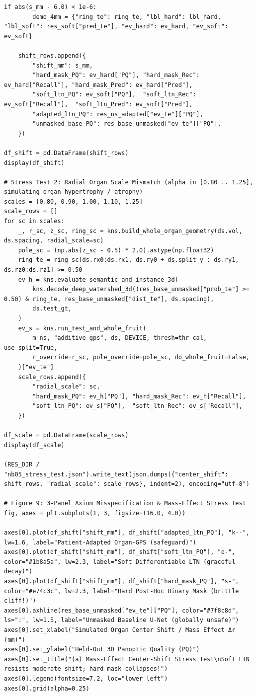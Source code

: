 \documentclass[10pt,a4paper]{article}
\renewcommand{\_}{\origunderscore\allowbreak}
\begin{document}
\begin{codebox}
\begin{lstlisting}[style=pybmed]
    if abs(s_mm - 6.0) < 1e-6:
        demo_4mm = {"ring_te": ring_te, "lbl_hard": lbl_hard, "lbl_soft": res_soft["pred_te"], "ev_hard": ev_hard, "ev_soft": ev_soft}

    shift_rows.append({
        "shift_mm": s_mm,
        "hard_mask_PQ": ev_hard["PQ"], "hard_mask_Rec": ev_hard["Recall"], "hard_mask_Pred": ev_hard["Pred"],
        "soft_ltn_PQ": ev_soft["PQ"],  "soft_ltn_Rec": ev_soft["Recall"],  "soft_ltn_Pred": ev_soft["Pred"],
        "adapted_ltn_PQ": res_ns_adapted["ev_te"]["PQ"],
        "unmasked_base_PQ": res_base_unmasked["ev_te"]["PQ"],
    })

df_shift = pd.DataFrame(shift_rows)
display(df_shift)

# Stress Test 2: Radial Organ Scale Mismatch (alpha in [0.80 .. 1.25], simulating organ hypertrophy / atrophy)
scales = [0.80, 0.90, 1.00, 1.10, 1.25]
scale_rows = []
for sc in scales:
    _, r_sc, z_sc, ring_sc = kns.build_whole_organ_geometry(ds.vol, ds.spacing, radial_scale=sc)
    pole_sc = (np.abs(z_sc - 0.5) * 2.0).astype(np.float32)
    ring_te = ring_sc[ds.rx0:ds.rx1, ds.ry0 + ds.split_y : ds.ry1, ds.rz0:ds.rz1] >= 0.50
    ev_h = kns.evaluate_semantic_and_instance_3d(
        kns.decode_deep_watershed_3d((res_base_unmasked["prob_te"] >= 0.50) & ring_te, res_base_unmasked["dist_te"], ds.spacing),
        ds.test_gt,
    )
    ev_s = kns.run_test_and_whole_fruit(
        m_ns, "additive_gps", ds, DEVICE, thresh=thr_cal, use_split=True,
        r_override=r_sc, pole_override=pole_sc, do_whole_fruit=False,
    )["ev_te"]
    scale_rows.append({
        "radial_scale": sc,
        "hard_mask_PQ": ev_h["PQ"], "hard_mask_Rec": ev_h["Recall"],
        "soft_ltn_PQ": ev_s["PQ"],  "soft_ltn_Rec": ev_s["Recall"],
    })

df_scale = pd.DataFrame(scale_rows)
display(df_scale)

(RES_DIR / "nb05_stress_test.json").write_text(json.dumps({"center_shift": shift_rows, "radial_scale": scale_rows}, indent=2), encoding="utf-8")

# Figure 9: 3-Panel Axiom Misspecification & Mass-Effect Stress Test
fig, axes = plt.subplots(1, 3, figsize=(16.0, 4.0))

axes[0].plot(df_shift["shift_mm"], df_shift["adapted_ltn_PQ"], "k--", lw=1.6, label="Patient-Adapted Organ-GPS (safeguard)")
axes[0].plot(df_shift["shift_mm"], df_shift["soft_ltn_PQ"], "o-", color="#1b8a5a", lw=2.3, label="Soft Differentiable LTN (graceful decay)")
axes[0].plot(df_shift["shift_mm"], df_shift["hard_mask_PQ"], "s-", color="#e74c3c", lw=2.3, label="Hard Post-Hoc Binary Mask (brittle cliff!)")
axes[0].axhline(res_base_unmasked["ev_te"]["PQ"], color="#7f8c8d", ls=":", lw=1.5, label="Unmasked Baseline U-Net (globally unsafe)")
axes[0].set_xlabel("Simulated Organ Center Shift / Mass Effect Δr (mm)")
axes[0].set_ylabel("Held-Out 3D Panoptic Quality (PQ)")
axes[0].set_title("(a) Mass-Effect Center-Shift Stress Test\nSoft LTN resists moderate shift; hard mask collapses!")
axes[0].legend(fontsize=7.2, loc="lower left")
axes[0].grid(alpha=0.25)


\end{lstlisting}
\end{codebox}
\end{document}
